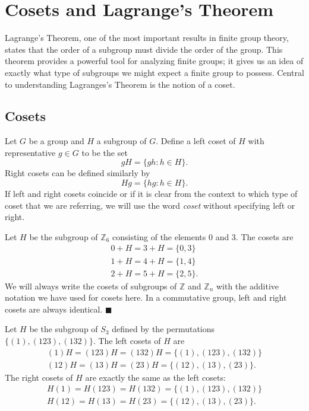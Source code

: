 \chapter{Cosets and Lagrange's Theorem}\label{cosets}


Lagrange's Theorem, one of the most important results in finite group theory, states that the order of a subgroup must divide the order of the group.  This theorem provides a powerful tool for analyzing finite groups; it gives us an idea of exactly what type of subgroups we might expect a finite group to possess.  Central to understanding Lagranges's Theorem is the notion of a coset.


\section{Cosets}

Let $G$ be a group and $H$ a subgroup of $G$.  Define a {\bfi left  coset\/} of $H$ with {\bfi  representative} $g \in G$ to be the set 
$$
gH = \{ gh : h \in H \}.
$$
{\bfi Right cosets\/} can be defined similarly by
$$
Hg = \{ hg : h \in H \}.
$$
If left and right cosets coincide or if it is clear from the context to which type of coset that we are referring, we will use the word {\em coset\/} without specifying left or right. 

\medskip

Let $H$ be the subgroup of ${\mathbb Z}_6$ consisting of the elements 0 and 3.  The cosets are 
\begin{gather*}
0 + H = 3 + H = \{ 0, 3 \} \\
1 + H = 4 + H = \{ 1, 4 \} \\
2 + H = 5 + H = \{ 2, 5 \}.
\end{gather*}
We will always write the cosets of subgroups of ${\mathbb Z}$ and ${\mathbb Z}_n$ with the additive notation we have used for cosets here.  In a commutative group, left and right cosets are always identical. 
\hspace{\fill} $\blacksquare$

\medskip

Let $H$ be the subgroup of $S_3$ defined by the permutations $\{(1), (123), (132) \}$.  The left cosets of $H$ are 
\begin{gather*}
(1)H = (1 2 3)H =  (132)H = \{(1), (1 23), (132) \} \\
(1 2)H = (1 3)H = (2 3)H =  \{ (1 2), (1 3), (2 3)  \}.
\end{gather*}
The right cosets of $H$ are exactly the same as the left cosets:
\begin{gather*}
H(1) = H(1 2 3) =  H(132) = \{(1), (1 23), (132) \} \\
H(1 2) = H(1 3) = H(2 3) =  \{ (1 2), (1 3), (2 3)  \}.
\end{gather*}

